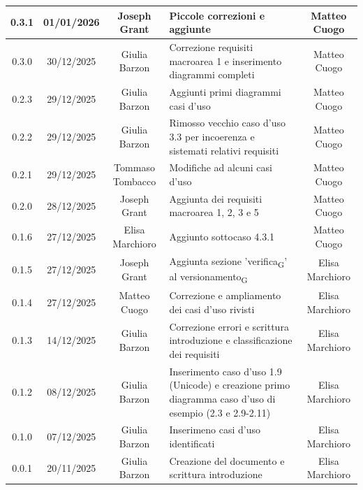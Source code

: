 \documentclass[11pt,a4paper]{article}
\newcommand{\gls}[1]{#1\textsubscript{G}}
\begin{document}
\begin{longtable}[H]{|c|c|c|>{\raggedright\arraybackslash}p{}|c|}
        \hline
        0.3.1 & 01/01/2026 & Joseph Grant & Piccole correzioni e aggiunte &  Matteo Cuogo\\
        \hline
        0.3.0 & 30/12/2025 & Giulia Barzon & Correzione requisiti macroarea 1 e inserimento diagrammi completi & Matteo Cuogo \\
        \hline
        0.2.3 & 29/12/2025 & Giulia Barzon & Aggiunti primi diagrammi casi d'uso &  Matteo Cuogo \\
        \hline
        0.2.2 & 29/12/2025 & Giulia Barzon & Rimosso vecchio caso d'uso 3.3 per incoerenza e sistemati relativi requisiti & Matteo Cuogo \\
        \hline
        0.2.1 & 29/12/2025 & Tommaso Tombacco & Modifiche ad alcuni casi d'uso &  Matteo Cuogo\\ 
        \hline
        0.2.0 & 28/12/2025 & Joseph Grant & Aggiunta dei requisiti macroarea 1, 2, 3 e 5 &  Matteo Cuogo\\ 
        \hline
        0.1.6 & 27/12/2025 & Elisa Marchioro & Aggiunto sottocaso 4.3.1 & Matteo Cuogo\\ 
        \hline
        0.1.5 & 27/12/2025 & Joseph Grant & Aggiunta sezione '\gls{verifica}' al \gls{versionamento} & Elisa Marchioro\\ 
        \hline
        0.1.4 & 27/12/2025 & Matteo Cuogo & Correzione e ampliamento dei casi d'uso rivisti & Elisa Marchioro\\
        \hline
        0.1.3 & 14/12/2025 & Giulia Barzon & Correzione errori e scrittura introduzione e classificazione dei requisiti & Elisa Marchioro\\
        \hline
        0.1.2 & 08/12/2025 & Giulia Barzon & Inserimento caso d'uso 1.9 (Unicode) e creazione primo diagramma caso d'uso di esempio (2.3 e 2.9-2.11) & Elisa Marchioro\\
        \hline
        0.1.0 & 07/12/2025 & Giulia Barzon & Inserimeno casi d'uso identificati & Elisa Marchioro\\
        \hline
        0.0.1 & 20/11/2025 & Giulia Barzon & Creazione del documento e scrittura introduzione & Elisa Marchioro\\
        \hline
\end{longtable}

\newpage

\tableofcontents
\thispagestyle{empty}
\newpage

\setcounter{page}{1}
\end{document}
